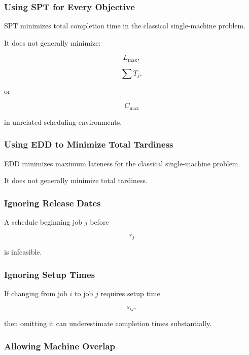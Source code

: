 \subsubsection{Using SPT for Every Objective}

SPT minimizes total completion time in the classical single-machine
problem.

It does not generally minimize:

\[
\boxed{
L_{\max},
}
\]

\[
\boxed{
\sum T_j,
}
\]

or

\[
\boxed{
C_{\max}
}
\]

in unrelated scheduling environments.

\subsubsection{Using EDD to Minimize Total Tardiness}

EDD minimizes maximum lateness for the classical single-machine problem.

It does not generally minimize total tardiness.

\subsubsection{Ignoring Release Dates}

A schedule beginning job \(j\) before

\[
r_j
\]

is infeasible.

\subsubsection{Ignoring Setup Times}

If changing from job \(i\) to job \(j\) requires setup time

\[
s_{ij},
\]

then omitting it can underestimate completion times substantially.

\subsubsection{Allowing Machine Overlap}

